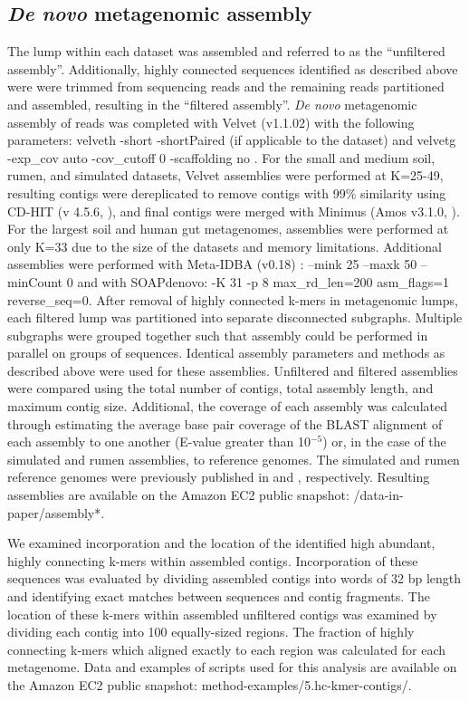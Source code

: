 \documentclass[10pt]{article}
\begin{document}
\subsection*{\emph{De novo} metagenomic assembly}

The lump within each dataset was assembled and referred to as the
``unfiltered assembly''.  Additionally, highly connected sequences
identified as described above were were trimmed from sequencing reads
and the remaining reads partitioned and assembled, resulting in the
``filtered assembly''.  \emph{De novo} metagenomic assembly of reads
was completed with Velvet (v1.1.02) with the following parameters:
velveth -short -shortPaired (if applicable to the dataset) and velvetg
-exp\_cov auto -cov\_cutoff 0 -scaffolding no \cite{Zerbino:2008p665}.
For the small and medium soil, rumen, and simulated datasets, Velvet
assemblies were performed at K=25-49, resulting contigs were
dereplicated to remove contigs with 99\% similarity using CD-HIT (v
4.5.6, \cite{Li:2001p1337}), and final contigs were merged with
Minimus (Amos v3.1.0, \cite{Sommer:2007p1253}).  For the largest soil
and human gut metagenomes, assemblies were performed at only K=33 due
to the size of the datasets and memory limitations.  Additional
assemblies were performed with Meta-IDBA (v0.18) \cite{Peng:2011p898}
: --mink 25 --maxk 50 --minCount 0 and with SOAPdenovo: -K 31 -p 8
max\_rd\_len=200 asm\_flags=1 reverse\_seq=0.  After removal of highly
connected k-mers in metagenomic lumps, each filtered lump was
partitioned into separate disconnected subgraphs.  Multiple subgraphs
were grouped together such that assembly could be performed in
parallel on groups of sequences.  Identical assembly parameters and
methods as described above were used for these assemblies.  Unfiltered
and filtered assemblies were compared using the total number of
contigs, total assembly length, and maximum contig size.  Additional,
the coverage of each assembly was calculated through estimating the
average base pair coverage of the BLAST alignment of each assembly to
one another (E-value greater than 10$^{-5}$) or, in the case of the
simulated and rumen assemblies, to reference genomes.  The simulated
and rumen reference genomes were previously published in
\cite{Hess:2011p686} and \cite{Pignatelli:2011p742}, respectively.
Resulting assemblies are available on the Amazon EC2 public snapshot:
/data-in-paper/assembly*.

We examined incorporation and the location of the identified high
abundant, highly connecting k-mers within assembled contigs.
Incorporation of these sequences was evaluated by dividing assembled
contigs into words of 32 bp length and identifying exact matches
between sequences and contig fragments.  The location of these k-mers
within assembled unfiltered contigs was examined by dividing each
contig into 100 equally-sized regions.  The fraction of highly
connecting k-mers which aligned exactly to each region was calculated
for each metagenome. Data and examples of scripts used for this
analysis are available on the Amazon EC2 public snapshot:
method-examples/5.hc-kmer-contigs/.
\end{document}

